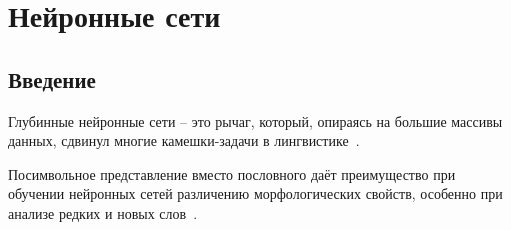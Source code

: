 \section{Нейронные сети} \label{sect_nn}

\subsection{Введение} \label{sect_nn_review}

Глубинные нейронные сети -- это рычаг, который, опираясь на большие массивы данных, сдвинул многие камешки-задачи в лингвистике~\cite[2827]{Cruz-Anastasopoulos-Stump2020Chatino}.

Посимвольное представление вместо пословного 
даёт преимущество при обучении нейронных сетей 
различению морфологических свойств, 
особенно при анализе редких и новых слов~\cite[868]{Belinkov2017NeuralLearnMorphology}.

